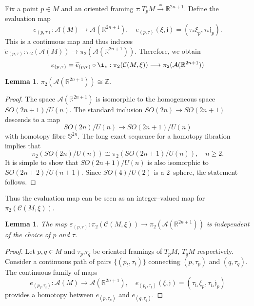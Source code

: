 \documentclass[10pt]{amsart}
\newtheorem{lemma}[proposition]{Lemma}
\begin{document}
\noindent Fix a point $p\in M$ and an oriented framing ${\tau}:T_pM\stackrel{\simeq}{\longrightarrow}{\mathbb{R}}^{2n+1}$. 
Define the evaluation map
$$e_{(p,\tau)}:{\mathcal{A}}(M)\longrightarrow{\mathcal{A}}({\mathbb{R}}^{2n+1}),\quad e_{(p,\tau)}(\xi, {\mathfrak{j}})= (\tau_{*}\xi_p, \tau_* {\mathfrak{j}}_p).$$
This is a continuous map and thus induces $\widetilde{e}_{(p,\tau)}:\pi_2({\mathcal{A}}(M))\longrightarrow\pi_2({\mathcal{A}}({\mathbb{R}}^{2n+1}))$. Therefore, we obtain
$$\varepsilon_{(p,\tau)}=\widetilde{e}_{(p,\tau)}\circ\i_*:\pi_2({\mathcal{C}}(M,\xi))\longrightarrow\pi_2({\mathcal{A}}({\mathbb{R}}^{2n+1}))$$
\begin{lemma}
$\pi_2({\mathcal{A}}({\mathbb{R}}^{2n+1}))\cong{\mathbb{Z}}$.
\end{lemma}
\begin{proof}
The space ${\mathcal{A}}({\mathbb{R}}^{2n+1})$ is isomorphic to the homogeneous space $SO(2n+1)/U(n)$. The standard inclusion $SO(2n)\longrightarrow SO(2n+1)$ descends to a map
$$SO(2n)/U(n)\longrightarrow SO(2n+1)/U(n)$$
with homotopy fibre ${\mathbb{S}}^{2n}$. The long exact sequence for a homotopy fibration implies that
$$\pi_2(SO(2n)/U(n))\cong\pi_2(SO(2n+1)/U(n)),\quad n\geq2.$$ It is simple to show that $SO(2n+1)/U(n)$ is also isomorphic to $SO(2n+2)/U(n+1)$. Since $SO(4)/U(2)$ is a $2$--sphere, the statement follows.
\end{proof}
\noindent Thus the evaluation map can be seen as an integer--valued map for $\pi_2({\mathcal{C}}(M,\xi))$.
\begin{lemma}
The map $\varepsilon_{(p,\tau)}:\pi_2({\mathcal{C}}(M,\xi))\longrightarrow\pi_2({\mathcal{A}}({\mathbb{R}}^{2n+1}))$ is independent of the choice of $p$ and $\tau$.
\end{lemma}
\begin{proof}
\noindent Let $p,q\in M$ and $\tau_p$,$\tau_q$ be oriented framings of $T_pM$, $T_qM$ respectively. Consider a continuous path of pairs $\{(p_t,\tau_t)\}$ connecting $(p,\tau_p)$ and $(q,\tau_q)$. The continuous family of maps
$$e_{(p_t,\tau_t)}:{\mathcal{A}}(M)\longrightarrow{\mathcal{A}}({\mathbb{R}}^{2n+1}),\quad e_{(p_t,\tau_t)}(\xi, {\mathfrak{j}})= (\tau_{t_{*}}\xi_p, \tau_{t_*} {\mathfrak{j}}_p)$$
provides a homotopy between $e_{(p,\tau_p)}$ and $e_{(q,\tau_q)}$.
\end{proof}
\end{document}
